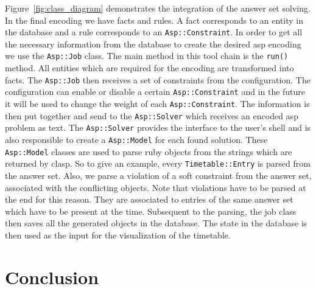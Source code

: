 \documentclass[12pt]{article} %
\newcommand{\job}{\texttt{Asp::Job}}
\newcommand{\model}{\texttt{Asp::Model}}
\newcommand{\solver}{\texttt{Asp::Solver}}
\newcommand{\constraint}{\texttt{Asp::Constraint}}
\newcommand{\entry}{\texttt{Timetable::Entry}}
\newcommand{\run}{\texttt{run()}}
\begin{document}
Figure~\ref{fig:class_diagram} demonstrates the integration of the answer set solving.
In the final encoding we have facts and rules.
A fact corresponds to an entity in the database and a rule corresponds to an \constraint{}.
In order to get all the necessary information from the database to create the desired asp encoding we use the \job{} class.
The main method in this tool chain is the \run{} method.
All entities which are required for the encoding are transformed into facts.
The \job{} then receives a set of constraints from the configuration.
The configuration can enable or disable a certain \constraint{} and in the future it will be used to change the weight of each \constraint{}.
The information is then put together and send to the \solver{} which receives an encoded asp problem as text.
The \solver{} provides the interface to the user's shell and is also responsible to create a \model{} for each found solution.
These \model{} classes are used to parse ruby objects from the strings which are returned by clasp.
So to give an example, every \entry{} is parsed from the answer set.
Also, we parse a violation of a soft constraint from the answer set, associated with the conflicting objects.
Note that violations have to be parsed at the end for this reason.
They are associated to entries of the same answer set which have to be present at the time.
Subsequent to the parsing, the job class then saves all the generated objects in the database.
The state in the database is then used as the input for the visualization of the timetable.


\section{Conclusion}



\begin{thebibliography}{99} %

 
\end{thebibliography}

\end{document}

